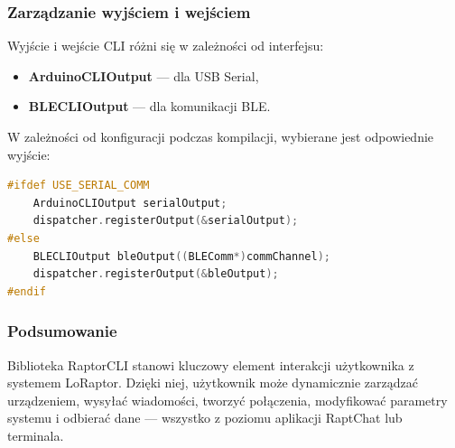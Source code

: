 \clearpage
\subsubsection{Zarządzanie wyjściem i wejściem}

Wyjście i wejście CLI różni się w zależności od interfejsu:
\begin{itemize}
	\item \textbf{ArduinoCLIOutput} — dla USB Serial,
	\item \textbf{BLECLIOutput} — dla komunikacji BLE.
\end{itemize}
W zależności od konfiguracji podczas kompilacji, wybierane jest odpowiednie wyjście:
\begin{lstlisting}[language=C++]
#ifdef USE_SERIAL_COMM
	ArduinoCLIOutput serialOutput;
	dispatcher.registerOutput(&serialOutput);
#else
	BLECLIOutput bleOutput((BLEComm*)commChannel);
	dispatcher.registerOutput(&bleOutput);
#endif
\end{lstlisting}

\clearpage
\subsubsection{Podsumowanie}

Biblioteka RaptorCLI stanowi kluczowy element interakcji użytkownika z systemem LoRaptor. Dzięki niej, użytkownik może dynamicznie zarządzać urządzeniem, wysyłać wiadomości, tworzyć połączenia, modyfikować parametry systemu i odbierać dane --- wszystko z poziomu aplikacji RaptChat lub terminala.